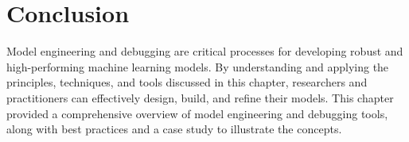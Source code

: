 \section{Conclusion}
Model engineering and debugging are critical processes for developing robust and high-performing machine learning models. By understanding and applying the principles, techniques, and tools discussed in this chapter, researchers and practitioners can effectively design, build, and refine their models. This chapter provided a comprehensive overview of model engineering and debugging tools, along with best practices and a case study to illustrate the concepts.


% 
% 